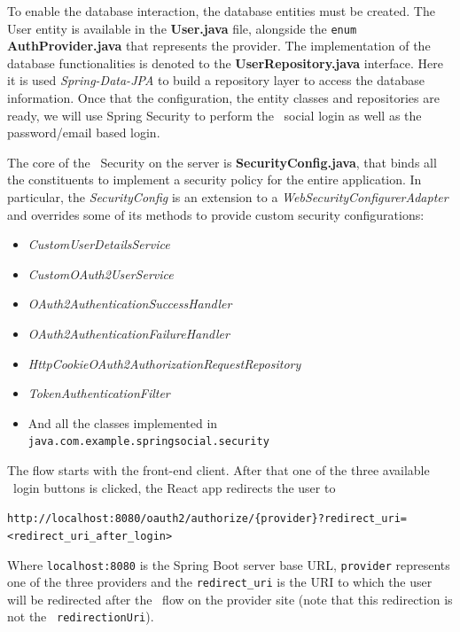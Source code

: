 To enable the database interaction, the database entities must be created. The User entity is available in the \textbf{User.java} file, alongside the \texttt{enum} \textbf{AuthProvider.java} that represents the provider. The implementation of the database functionalities is denoted to the \textbf{UserRepository.java} interface. Here it is used \textit{Spring-Data-JPA} to build a repository layer to access the database information.
Once that the configuration, the entity classes and repositories are ready, we will use Spring Security to perform the \oauth\ social login as well as the password/email based login.

The core of the \oauth\ Security on the server is \textbf{SecurityConfig.java}, that binds all the constituents to implement a security policy for the entire application. In particular, the \textit{SecurityConfig} is an extension to a  \textit{WebSecurityConfigurerAdapter} and overrides some of its methods to provide custom security configurations:

\begin{itemize}
    \item \textit{CustomUserDetailsService}
    \item \textit{CustomOAuth2UserService}
    \item \textit{OAuth2AuthenticationSuccessHandler}
    \item \textit{OAuth2AuthenticationFailureHandler}
    \item \textit{HttpCookieOAuth2AuthorizationRequestRepository}
    \item \textit{TokenAuthenticationFilter}
    \item And all the classes implemented in \texttt{java.com.example.springsocial.security}
\end{itemize}

\noindent The flow starts with the front-end client. After that one of the three available \oauth\ login buttons is clicked, the React app redirects the user to \\

\vspace{0.1cm}

\hypertarget{foo}{}

\texttt{\footnotesize{http://localhost:8080/oauth2/authorize/\{provider\}?redirect\_uri=<redirect\_uri\_after\_login>}} \\

\vspace{0.1cm}

\noindent Where \texttt{localhost:8080} is the Spring Boot server base URL, \texttt{provider} represents one of the three providers and the \texttt{redirect\_uri} is the URI to which the user will be redirected after the \oauth\ flow on the provider site (note that this redirection is not the \oauth\ \texttt{redirectionUri}).


